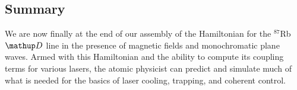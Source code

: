 \subsection{Summary}
We are now finally at the end of our assembly of the Hamiltonian for the $^{87}$Rb $\up{D}$ line in the presence of magnetic fields and monochromatic plane waves. Armed with this Hamiltonian and the ability to compute its coupling terms for various lasers, the atomic physicist can predict and simulate much of what is needed for the basics of laser cooling, trapping, and coherent control.
